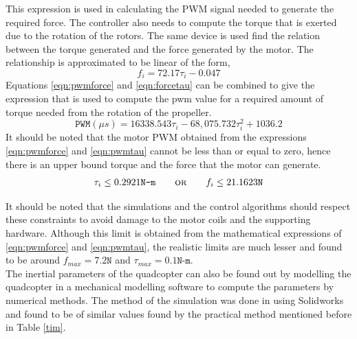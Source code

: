 \documentclass[letterpaper%
, twoside%
, 12pt%
,memoire%
, english%
,creativecommons,hyperref%
]{thETS}
\theoremstyle{newThmStyle}
\begin{document}
This expression is used in calculating the PWM signal needed to generate the required force. The controller also needs to compute the torque that is exerted due to the rotation of the rotors. The same device is used find the relation between the torque generated and the force generated by the motor. The relationship is approximated to be linear of the form, 
\begin{equation} \label{eqn:forcetau}
f_i=72.17\tau_i-0.047
\end{equation}
Equations \eqref{eqn:pwmforce} and \eqref{eqn:forcetau} can be combined to give the expression that is used to compute the pwm value for a required amount of torque needed from the rotation of the propeller. 
\begin{equation} \label{eqn:pwmtau}
\texttt{PWM} (\mu s)= 16338.543\tau_i -68,075.732\tau_i^2 +1036.2
\end{equation}
It should be noted that the motor PWM obtained from the expressions \eqref{eqn:pwmforce} and \eqref{eqn:pwmtau} cannot be less than or equal to zero, hence there is an upper bound torque and the force that the motor can generate. 
\begin{align}
\tau_i \leq 0.2921\texttt{N-m} \qquad \textsc{or}\qquad f_i \leq  21.1623\texttt{N}
\end{align}

It should be noted that the simulations and the control algorithms should respect these constraints to avoid damage to the motor coils and the supporting hardware. Although this limit is obtained from the mathematical expressions of \eqref{eqn:pwmforce} and \eqref{eqn:pwmtau}, the realistic limits are much lesser and found to be around $f_{max}=7.2\texttt{N}$ and $\tau_{max}=0.1\texttt{N-m}$.\\ 
The inertial parameters of the quadcopter can also be found out by modelling the quadcopter in a mechanical modelling software to compute the parameters by numerical methods. The method of the simulation was done in \citep{RN114} using Solidworks and found to be of similar values found by the practical method mentioned before in Table \ref{tim}.

\end{document}
